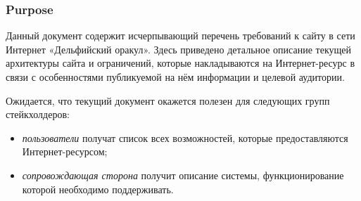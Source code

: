 \subsubsection{Purpose}

Данный документ содержит исчерпывающий перечень требований к сайту в сети Интернет «Дельфийский оракул». Здесь приведено детальное описание текущей архитектуры сайта и ограничений, которые накладываются на Интернет-ресурс в связи с особенностями публикуемой на нём информации и целевой аудитории.

Ожидается, что текущий документ окажется полезен для следующих групп стейкхолдеров:
\begin{itemize}
  \item \textit{пользователи} получат список всех возможностей, которые предоставляются Интернет-ресурсом;
  \item \textit{сопровождающая сторона} получит описание системы, функционирование которой необходимо поддерживать.
\end{itemize}